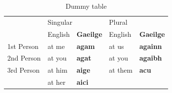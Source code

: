 \begin{table}
  \caption{Dummy table}
  \begin{tabular}{|l||l|l||l|l|}
    \hline
     &\multicolumn{2}{l|}{Singular}&\multicolumn{2}{l|}{Plural}\\
    \cline{2-5}
     &English&\textbf{Gaeilge}&English&\textbf{Gaeilge}\\
    \hline\hline
    1st Person&at me&\textbf{agam}&at us&\textbf{againn}\\
    2nd Person&at you&\textbf{agat}&at you&\textbf{agaibh}\\
    3rd Person&at him&\textbf{aige}&at them&\textbf{acu}\\
     &at her&\textbf{aici}& & \\
    \hline
  \end{tabular}
\end{table}
